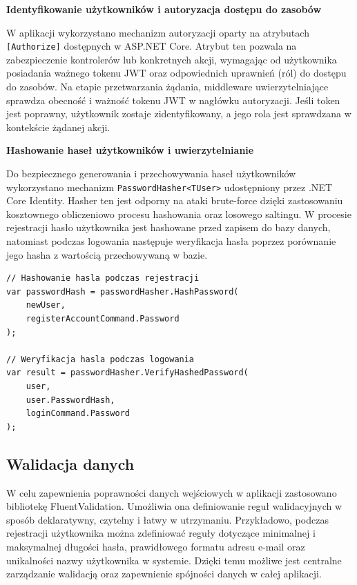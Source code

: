 \noindent
\textbf{Identyfikowanie użytkowników i autoryzacja dostępu do zasobów}

W aplikacji wykorzystano mechanizm autoryzacji oparty na atrybutach \texttt{[Authorize]} dostępnych w \linebreak ASP.NET Core. Atrybut ten pozwala na zabezpieczenie kontrolerów lub konkretnych akcji, wymagając od użytkownika posiadania ważnego tokenu JWT oraz odpowiednich uprawnień (ról) do dostępu do zasobów.
Na etapie przetwarzania żądania, middleware uwierzytelniające sprawdza obecność i ważność tokenu JWT w nagłówku autoryzacji. Jeśli token jest poprawny, użytkownik zostaje zidentyfikowany, a jego rola jest sprawdzana w kontekście żądanej akcji.

\pagebreak
\noindent
\textbf{Hashowanie haseł użytkowników i uwierzytelnianie}

Do bezpiecznego generowania i przechowywania haseł użytkowników wykorzystano mechanizm \linebreak \texttt{PasswordHasher<TUser>} udostępniony przez .NET Core Identity. Hasher ten jest odporny na ataki brute-force dzięki zastosowaniu kosztownego obliczeniowo procesu hashowania oraz losowego saltingu.
W procesie rejestracji hasło użytkownika jest hashowane przed zapisem do bazy danych, natomiast podczas logowania następuje weryfikacja hasła poprzez porównanie jego hasha z wartością przechowywaną w bazie.

\smallskip
\begin{lstlisting}[language={[Sharp]C}, caption={Hashowanie i weryfikacja hasła użytkownika}]
// Hashowanie hasla podczas rejestracji
var passwordHash = passwordHasher.HashPassword(
    newUser, 
    registerAccountCommand.Password
);

// Weryfikacja hasla podczas logowania
var result = passwordHasher.VerifyHashedPassword(
    user, 
    user.PasswordHash, 
    loginCommand.Password
);
\end{lstlisting}

\subsection{Walidacja danych}
W celu zapewnienia poprawności danych wejściowych w aplikacji zastosowano bibliotekę FluentValidation. Umożliwia ona definiowanie reguł walidacyjnych w sposób deklaratywny, czytelny i łatwy w utrzymaniu. Przykładowo, podczas rejestracji użytkownika można zdefiniować reguły dotyczące minimalnej i maksymalnej długości hasła, prawidłowego formatu adresu e-mail oraz unikalności nazwy użytkownika w systemie. Dzięki temu możliwe jest centralne zarządzanie walidacją oraz zapewnienie spójności danych w całej aplikacji.

